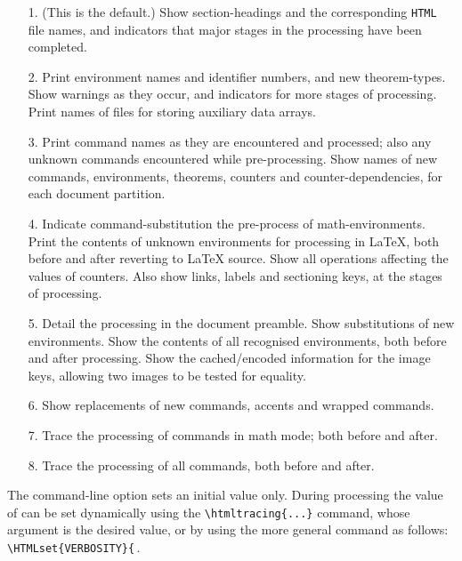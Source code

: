 \begin{htmllist}
\begin{changebar}
\begin{itemize}
\item[1. ] (This is the default.)
Show section-headings and the corresponding \texttt{HTML} file names,
and indicators that major stages in the processing have been completed.

\item[2. ]
Print environment names and identifier numbers, and new theorem-types.
Show warnings as they occur, and indicators for more stages of processing.
Print names of files for storing auxiliary data arrays.

\item[3. ]
Print command names as they are encountered and processed; also
any unknown commands encountered while pre-processing.
Show names of new commands, environments, theorems, counters and
counter-dependencies, for each document partition.

\item[4. ]
Indicate command-substitution the pre-process of math-environments.
Print the contents of unknown environments for processing in \LaTeX,
both before and after reverting to \LaTeX{} source.
Show all operations affecting the values of counters.
Also show links, labels and sectioning keys, at the stages of processing.

\item[5. ]
Detail the processing in the document preamble.
Show substitutions of new environments.
Show the contents of all recognised environments, both before
and after processing. Show the cached/encoded information for the image keys,
allowing two images to be tested for equality.

\item[6. ]
Show replacements of new commands, accents and wrapped commands.

\item[7. ]
Trace the processing of commands in math mode; both before and after.

\item[8. ]
Trace the processing of all commands, both before and after.

\end{itemize}
%
The command-line option sets an initial value only.
During processing the value of  can be set
dynamically using the \verb|\htmltracing{...}| command,
whose argument is the desired value,
or by using the more general  command
as follows: \verb|\HTMLset{VERBOSITY}{|\texttt{}\,.
\end{changebar}
%
\end{htmllist}
%
%

